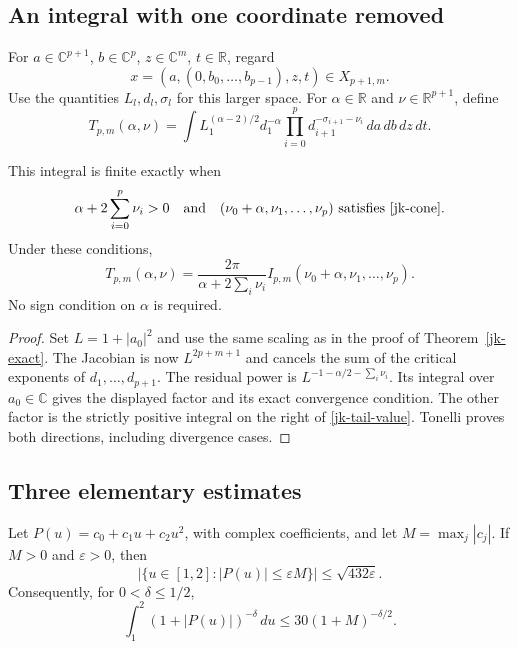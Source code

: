 \subsection{An integral with one coordinate removed}

For \(a\in\mathbb C^{p+1}\), \(b\in\mathbb C^p\),
\(z\in\mathbb C^m\), \(t\in\mathbb R\), regard
\[
 x=(a,(0,b_0,\ldots,b_{p-1}),z,t)\in X_{p+1,m}.
\]
Use the quantities \(L_l,d_l,\sigma_l\) for this larger space.
For \(\alpha\in\mathbb R\) and \(\nu\in\mathbb R^{p+1}\), define
\[
 T_{p,m}(\alpha,\nu)=
 \int L_1^{(\alpha-2)/2}d_1^{-\alpha}
                \prod_{i=0}^{p}d_{i+1}^{-\sigma_{i+1}-\nu_i}
                                      \,da\,db\,dz\,dt .
\]

\begin{corollary}\label{jk-tail}
This integral is finite exactly when
\[
 \alpha+2\sum_{i=0}^{p}\nu_i>0
 \quad\hbox{and}\quad
 (\nu_0+\alpha,\nu_1,\ldots,\nu_p)
                 \text{ satisfies \eqref{jk-cone}}.
\]
Under these conditions,
\begin{equation}\label{jk-tail-value}
 T_{p,m}(\alpha,\nu)=
       \frac{2\pi}{\alpha+2\sum_i\nu_i}
          I_{p,m}(\nu_0+\alpha,\nu_1,\ldots,\nu_p).
\end{equation}
No sign condition on \(\alpha\) is required.
\end{corollary}

\begin{proof}
Set \(L=1+|a_0|^2\) and use the same scaling as in the
proof of Theorem~\ref{jk-exact}.
The Jacobian is now \(L^{2p+m+1}\) and cancels the sum
of the critical exponents of \(d_1,\ldots,d_{p+1}\).
The residual power is
\(L^{-1-\alpha/2-\sum_i\nu_i}\).
Its integral over \(a_0\in\mathbb C\) gives the displayed factor
and its exact convergence condition.  The other factor is the
strictly positive integral on the right of \eqref{jk-tail-value}.
Tonelli proves both directions, including divergence cases.
\end{proof}

\subsection{Three elementary estimates}

\begin{lemma}\label{jk-sublevel}
Let \(P(u)=c_0+c_1u+c_2u^2\), with complex coefficients, and let
\(M=\max_j|c_j|\).  If \(M>0\) and \(\varepsilon>0\), then
\begin{equation}\label{jk-sublevel-measure}
 \bigl|\{u\in[1,2]:|P(u)|\leq\varepsilon M\}\bigr|
                                  \leq \sqrt{432\varepsilon}.
\end{equation}
Consequently, for \(0<\delta\leq1/2\),
\begin{equation}\label{jk-sublevel-integral}
 \int_1^2(1+|P(u)|)^{-\delta}\,du
                         \leq30(1+M)^{-\delta/2}.
\end{equation}
\end{lemma}

